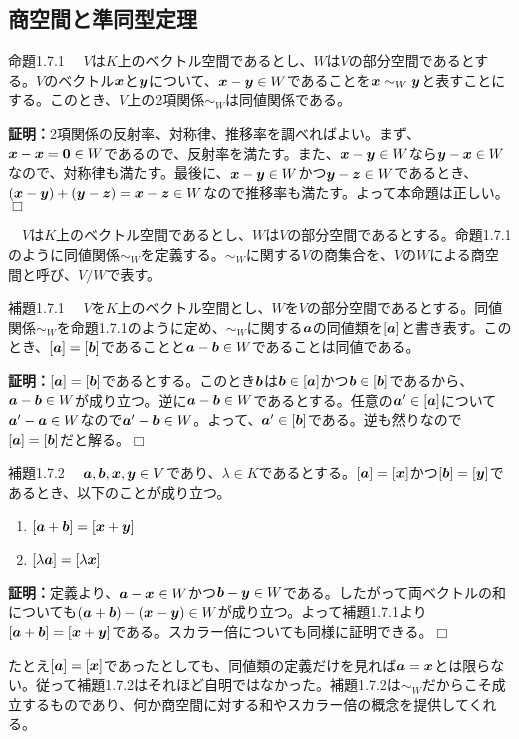 \documentclass[dvipdfmx, 9pt, a4paper]{jsarticle}
\numberwithin{equation}{subsection}
\newcommand{\bm}[1]{{\mbox{\boldmath $#1$}}}
\def\qed{\hfill $\Box$}
\begin{document}
\subsection{商空間と準同型定理}
\begin{itembox}[l]{命題1.7.1}
　$V$は$K$上のベクトル空間であるとし、$W$は$V$の部分空間であるとする。$V$のベクトル$\bm x$と$\bm y$について、$\bm x-\bm y \in W$であることを$\bm x \sim_W\bm y$と表すことにする。このとき、$V$上の2項関係$\sim_W$は同値関係である。
\end{itembox}
{\bf 証明：}2項関係の反射率、対称律、推移率を調べればよい。まず、$\bm x-\bm x=\bm 0 \in W$であるので、反射率を満たす。また、$\bm x-\bm y \in W$なら$\bm y-\bm x \in W$なので、対称律も満たす。最後に、$\bm x-\bm y \in W$かつ$\bm y-\bm z \in W$であるとき、$(\bm x-\bm y)+(\bm y-\bm z)=\bm x-\bm z \in W$なので推移率も満たす。よって本命題は正しい。\qed

\begin{tcolorbox}[title=商空間]
　$V$は$K$上のベクトル空間であるとし、$W$は$V$の部分空間であるとする。命題1.7.1のように同値関係$\sim_W$を定義する。$\sim_W$に関する$V$の商集合を、$V$の$W$による商空間と呼び、$V/W$で表す。
\end{tcolorbox}

\begin{itembox}[l]{補題1.7.1}
　$V$を$K$上のベクトル空間とし、$W$を$V$の部分空間であるとする。同値関係$\sim_W$を命題1.7.1のように定め、$\sim_W$に関する$\bm a$の同値類を$[\bm a]$と書き表す。このとき、$[\bm a]=[\bm b]$であることと$\bm a-\bm b \in W$であることは同値である。
\end{itembox}
{\bf 証明：}$[\bm a]=[\bm b]$であるとする。このとき$\bm b$は$\bm b \in [\bm a]$かつ$\bm b \in [\bm b]$であるから、$\bm a-\bm b \in W$が成り立つ。逆に$\bm a-\bm b \in W$であるとする。任意の$\bm a' \in [\bm a]$について$\bm a'-\bm a \in W$なので$\bm a'-\bm b \in W$。よって、$\bm a' \in [\bm b]$である。逆も然りなので$[\bm a]=[\bm b]$だと解る。\qed
\begin{itembox}[l]{補題1.7.2}
　$\bm a, \bm b, \bm x, \bm y \in V$であり、$\lambda \in K$であるとする。$[\bm a]=[\bm x]$かつ$[\bm b]=[\bm y]$であるとき、以下のことが成り立つ。
\begin{enumerate}
\item $[\bm a+\bm b]=[\bm x+\bm y]$
\item $[\lambda \bm a]=[\lambda \bm x]$
\end{enumerate}
\end{itembox}
{\bf 証明：}定義より、$\bm a-\bm x \in W$かつ$\bm b-\bm y \in W$である。したがって両ベクトルの和についても$(\bm a+\bm b)-(\bm x-\bm y) \in W$が成り立つ。よって補題1.7.1より$[\bm a+\bm b]=[\bm x+\bm y]$である。スカラー倍についても同様に証明できる。\qed \par
たとえ$[\bm a]=[\bm x]$であったとしても、同値類の定義だけを見れば$\bm a=\bm x$とは限らない。従って補題1.7.2はそれほど自明ではなかった。補題1.7.2は$\sim_W$だからこそ成立するものであり、何か商空間に対する和やスカラー倍の概念を提供してくれる。
\end{document}
